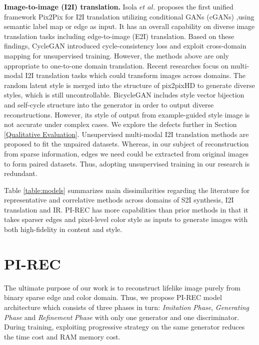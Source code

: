 \documentclass[10pt,twocolumn,letterpaper]{article} \usepackage{amsfonts,amssymb}
\begin{document}
{\bf Image-to-image (I2I) translation.} Isola $et$ $al$. \cite{isola2017image} proposes the first unified framework Pix2Pix for I2I translation utilizing conditional GANs (cGANs) \cite{mirza2014conditional},using semantic label map or edge as input. It has an overall capability on diverse image translation tasks inc\-lu\-ding edge-to-image (E2I) translation. Based on these fin\-dings, CycleGAN \cite{zhu2017unpaired} introduced cycle-consistency loss and exploit cross-domain mapping for unsupervised training. However, the methods above are only appropriate to one-to-one domain translation. Recent researches focus on multi-modal I2I translation\cite{choi2018stargan,romero2018smit,anoosheh2018combogan} tasks which could transform images across domains. The random latent style is merged into the structure of pix2pixHD \cite{wang2018high} to generate diverse styles, which is still uncontrollable. BicycleGAN \cite{zhu2017toward} includes style vector bijection and self-cycle structure into the generator in order to output diverse reconstructions. However, its style of output from example-guided style image is not accurate under complex cases. We explore the defects further in Section \ref{Qualitative Evaluation}. Unsupervised multi-modal I2I translation methods \cite{lee2018diverse} are proposed to fit the unpaired datasets. Whereas, in our subject of reconstruction from sparse information, edges we need could be extracted from original images to form paired datasets. Thus, adopting unsupervised training in our research is redundant.

Table \ref{table:models} summarizes main dissimilarities regarding the literature for representative and correlative methods across domains of S2I synthesis, I2I translation and IR. PI-REC has more capabilities than prior methods in that it takes sparser edges and pixel-level color style as inputs to generate images with both high-fidelity in content and style.

\section{PI-REC} \label{PI-REC}The ultimate purpose of our work is to reconstruct lifelike image purely from binary sparse edge and color domain.  Thus, we propose PI-REC model architecture which consists of three phases in turn: \emph{Imitation} \emph{Phase}, \emph{Generating} \emph{Phase} and \emph{Refinement} \emph{Phase} with only one generator and one discriminator. During training, exploiting progressive strategy on the same generator reduces the time cost and RAM memory cost.
\end{document}
